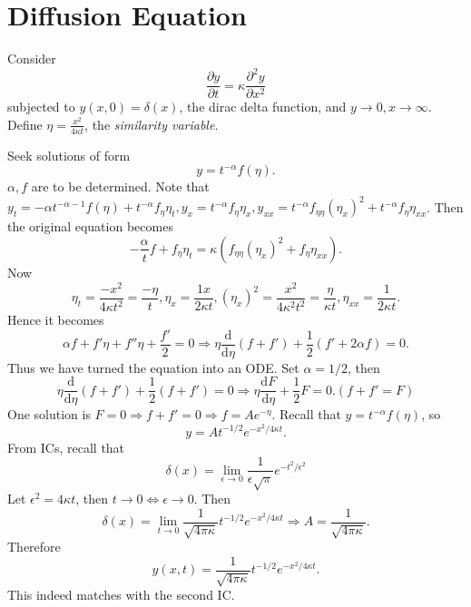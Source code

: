 \documentclass[10pt]{article}
\begin{document}
      \section{Diffusion Equation}
      \begin{example}
          Consider 
          \[
              \frac{\partial y}{\partial t} = \kappa \frac{\partial^2 y}{\partial x^2}  
          \]
          subjected to $ y(x,0)=\delta(x) $, the dirac delta function, and $ y\to 0, x\to \infty $. Define $ \eta=\frac{x^2}{4\kappa t} $, the \textit{similarity variable}.

          Seek solutions of form
          \[
              y=t^{-\alpha}f(\eta).
          \]
          $\alpha,f$ are to be determined. Note that $ y_t=-\alpha t^{-\alpha-1}f(\eta)+t^{-\alpha}f_{\eta}\eta_t, y_x=t^{-\alpha}f_{\eta}\eta_x, y_{xx}=t^{-\alpha}f_{\eta \eta}(\eta_x)^2+t^{-\alpha}f_{\eta}\eta_{xx}$. Then the original equation becomes 
          \[
              -\frac{\alpha}{t}f+f_{\eta}\eta_t=\kappa(f_{\eta \eta}(\eta_x)^2+f_\eta \eta_{xx}).
          \]
          Now 
          \[
              \eta_t = \frac{-x^2}{4\kappa t^2} = \frac{-\eta}{t}, \eta_x = \frac{1x}{2\kappa t}, (\eta_x)^2 = \frac{x^2}{4\kappa^2 t^2}= \frac{\eta}{\kappa t}, \eta_{xx}=\frac{1}{2\kappa t}.
          \]
          Hence it becomes 
          \[
              \alpha f+f'\eta+f''\eta+\frac{f'}{2}=0 \Longrightarrow \eta \frac{\mathrm{d}}{\mathrm{d}\eta}\left( f+f' \right) +\frac{1}{2}(f'+2\alpha f)=0.
          \]
          Thus we have turned the equation into an ODE. Set $ \alpha=1/2 $, then 
          \[
            \eta \frac{\mathrm{d}}{\mathrm{d}\eta}\left( f+f' \right) +\frac{1}{2}(f+f')=0 \Longrightarrow \eta \frac{\mathrm{d}F}{\mathrm{d}\eta} +\frac{1}{2}F=0.(f+f'=F)
          \]
          One solution is $ F=0 \Rightarrow f+f'=0 \Rightarrow f=Ae^{-\eta} $. Recall that $ y=t^{-\alpha}f(\eta) $, so 
          \[
              y=A t^{-1/2}e^{-x^2/4\kappa t}.
          \]
          From ICs, recall that 
          \[
              \delta(x)=\lim_{\epsilon \to 0} \frac{1}{\epsilon\sqrt{\pi}}e^{-t^2/\epsilon^2}
          \]
        Let $ \epsilon^2=4 \kappa t $, then $ t\to 0 \Leftrightarrow \epsilon\to 0 $. Then 
        \[
            \delta(x)=\lim_{t \to 0} \frac{1}{\sqrt{4\pi \kappa}}t^{-1/2}e^{-x^2/4\kappa t} \Longrightarrow A=\frac{1}{\sqrt{4\pi \kappa}}.
        \]
        Therefore 
        \[
            y(x,t)=\frac{1}{\sqrt{4\pi \kappa}}t^{-1/2}e^{-x^2/4\kappa t}.
        \]
        This indeed matches with the second IC.
      \end{example}
\end{document}
